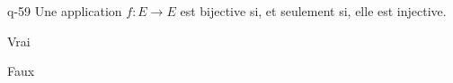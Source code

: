 \begin{truefalse}{q-59}
Une application $f:E\to E$ est bijective si, et seulement si, elle est injective.
\item Vrai
\item* Faux
\end{truefalse}

